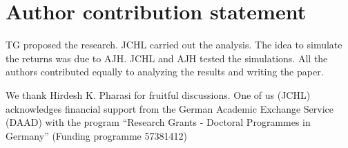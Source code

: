 \section{Author contribution statement}

TG proposed the research. JCHL carried out the analysis. The idea to simulate
the returns was due to AJH. JCHL and AJH tested the simulations. All the
authors contributed equally to analyzing the results and writing the paper.

We thank Hirdesh K. Pharasi for fruitful discussions. One of us (JCHL)
acknowledges financial support from the German Academic Exchange Service
(DAAD) with the program ``Research Grants - Doctoral Programmes in Germany''
(Funding programme 57381412)


